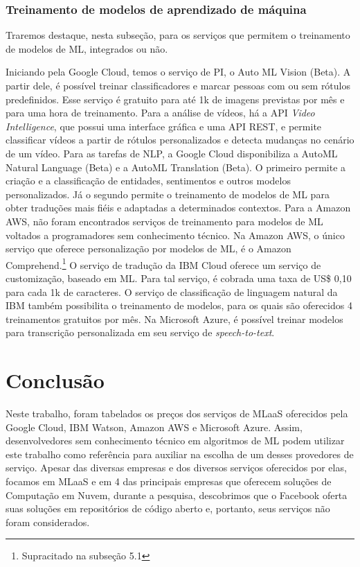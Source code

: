 \documentclass{article}
\begin{document}
\subsubsection{Treinamento de modelos de aprendizado de máquina}
Traremos destaque, nesta subseção, para os serviços que permitem o treinamento de modelos de ML, integrados ou não.

Iniciando pela Google Cloud, temos o serviço de PI, o Auto ML Vision (Beta). A partir dele, é possível treinar classificadores e marcar pessoas com ou sem rótulos predefinidos. Esse serviço é gratuito para até 1k de imagens previstas por mês e para uma hora de treinamento. Para a análise de vídeos, há a API \textit{Video Intelligence}, que possui uma interface gráfica e uma API REST, e permite classificar vídeos a partir de rótulos personalizados e detecta mudanças no cenário de um vídeo. Para as tarefas de NLP, a Google Cloud disponibiliza a AutoML Natural Language (Beta) e a AutoML Translation (Beta). O primeiro permite a criação e a classificação de entidades, sentimentos e outros modelos personalizados. Já o segundo permite o treinamento de modelos de ML para obter traduções mais fiéis e adaptadas a determinados contextos. Para a Amazon AWS, não foram encontrados serviços de treinamento para modelos de ML voltados a programadores sem conhecimento técnico. Na Amazon AWS, o único serviço que oferece personalização por modelos de ML, é o Amazon Comprehend.\footnote{Supracitado na subseção 5.1}
O serviço de tradução da IBM Cloud oferece um serviço de customização, baseado em ML. Para tal serviço, é cobrada uma taxa de US\$ 0,10 para cada 1k de caracteres. O serviço de classificação de linguagem natural da IBM também possibilita o treinamento de modelos, para os quais são oferecidos 4 treinamentos gratuitos por mês. Na Microsoft Azure, é possível treinar modelos para transcrição personalizada em seu serviço de \textit{speech-to-text}.

\section{Conclusão}
Neste trabalho, foram tabelados os preços dos serviços de MLaaS oferecidos pela Google Cloud, IBM Watson, Amazon AWS e Microsoft Azure. Assim, desenvolvedores sem conhecimento técnico em algoritmos de ML podem utilizar este trabalho como referência para auxiliar na escolha de um desses provedores de serviço. Apesar das diversas empresas e dos diversos serviços oferecidos por elas, focamos em MLaaS e em 4 das principais empresas que oferecem soluções de Computação em Nuvem, durante a pesquisa, descobrimos que o Facebook oferta suas soluções em repositórios de código aberto e, portanto, seus serviços não foram considerados.
\end{document}

